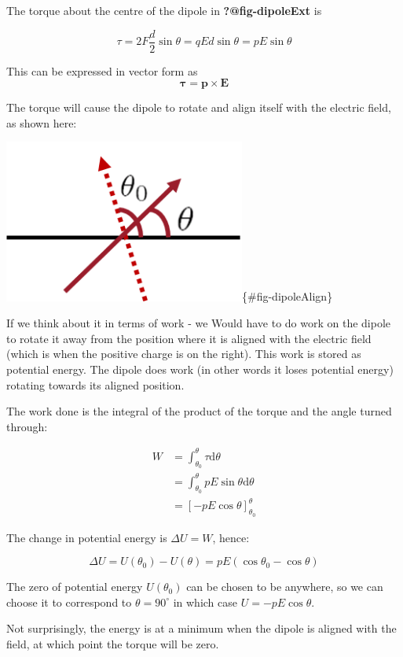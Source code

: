 \documentclass[
  letterpaper,
  DIV=11,
  numbers=noendperiod]{scrreprt}
\begin{document}
The torque about the centre of the dipole in \textbf{?@fig-dipoleExt} is

\[ \tau = 2 F \frac{d}{2} \sin\theta = qEd\sin\theta = p E \sin\theta \]

This can be expressed in vector form as
\[ \mathrm{\mathbf{\tau}} = \mathrm{\mathbf{p}}\times \mathrm{\mathbf{E}}\]

The torque will cause the dipole to rotate and align itself with the
electric field, as shown here:

\includegraphics[width=3.125in,height=\textheight]{Figures/dipole_align.png}\{\#fig-dipoleAlign\}

If we think about it in terms of work - we Would have to do work on the
dipole to rotate it away from the position where it is aligned with the
electric field (which is when the positive charge is on the right). This
work is stored as potential energy. The dipole does work (in other words
it loses potential energy) rotating towards its aligned position.

The work done is the integral of the product of the torque and the angle
turned through:

\[
\begin{split} 
W & = \int_{\theta_0}^{\theta} \tau \mathrm{d} \theta \\
& = \int_{\theta_0}^{\theta} pE\sin\theta \mathrm{d} \theta \\
& = [-pE \cos \theta]_{\theta_0}^{\theta} 
\end{split}
\]

The change in potential energy is \(\Delta U = W\), hence:

\[ \Delta U = U(\theta_0) - U (\theta) = pE(\cos\theta_0 - \cos\theta) \]

The zero of potential energy \(U(\theta_0)\) can be chosen to be
anywhere, so we can choose it to correspond to \(\theta = 90^{\circ}\)
in which case \(U = -pE\cos\theta\).

Not surprisingly, the energy is at a minimum when the dipole is aligned
with the field, at which point the torque will be zero.
\end{document}
